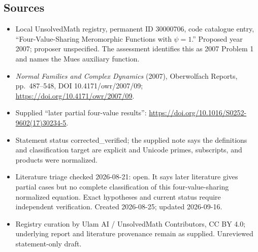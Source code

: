 \documentclass[11pt]{article}
\begin{document}
\subsection{Sources}
\begin{itemize}
\item Local UnsolvedMath registry, permanent ID 30000706, code catalogue entry, ``Four-Value-Sharing Meromorphic Functions with $\psi=1$.'' Proposed year 2007; proposer unspecified. The assessment identifies this as 2007 Problem 1 and names the Mues auxiliary function.
\item \emph{Normal Families and Complex Dynamics} (2007), Oberwolfach Reports, pp.\ 487--548, DOI 10.4171/owr/2007/09; \url{https://doi.org/10.4171/owr/2007/09}.
\item Supplied ``later partial four-value results'': \url{https://doi.org/10.1016/S0252-9602(17)30234-5}.
\item Statement status corrected\_verified; the supplied note says the definitions and classification target are explicit and Unicode primes, subscripts, and products were normalized.
\item Literature triage checked 2026-08-21: open. It says later literature gives partial cases but no complete classification of this four-value-sharing normalized equation. Exact hypotheses and current status require independent verification. Created 2026-08-25; updated 2026-09-16.
\item Registry curation by Ulam AI / UnsolvedMath Contributors, CC BY 4.0; underlying report and literature provenance remain as supplied. Unreviewed statement-only draft.
\end{itemize}
\end{document}
